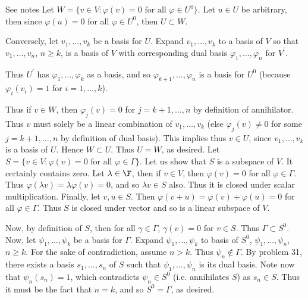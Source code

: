 \documentclass{book}
\begin{document}
\begin{enumerate}[label=\arabic*)]
\begin{enumerate}[label=\alph*)]
      \end{enumerate}
    \ii
      See notes
    \ii
      Let $W = \{v \in V: \varphi(v) = 0 \text{ for all } \varphi \in U^0\}$. Let $u \in U$ be arbitrary, then since $\varphi(u) = 0$ for all $\varphi \in U^0$, then $U \subset W$. 

      Conversely, let $v_1, \dots, v_k$ be a basis for $U$. Expand $v_1, \dots, v_k$ to a basis of $V$ so that $v_1, \dots, v_n$, $n \geq k$, is a basis of $V$ with corresponding dual basis
      $\varphi_1, \dots, \varphi_n$ for $V^{\prime}$. 

      Thus $U^{\prime}$ has $\varphi_1, \dots, \varphi_k$ as a basis, and so $\varphi_{k + 1}, \dots, \varphi_{n}$ is a basis for $U^0$ (because $\varphi_i(v_i) = 1$ for $i = 1, \dots, k$). 

      Thus if $v \in W$, then $\varphi_j(v) = 0$ for $j = k + 1, \dots, n$ by definition of annihilator. Thus $v$ must solely be a linear combination of $v_1, \dots, v_k$ (else
      $\varphi_{j}(v) \neq 0$ for some $j = k + 1, \dots, n$ by definition of dual basis). This implies thus $v \in U$, since $v_1, \dots, v_k$ is a basis of $U$. Hence $W \subset U$. Thus
      $U = W$, as desired.
    \ii
      Let $S = \{v \in V: \varphi(v) = 0 \text { for all } \varphi \in \Gamma\}$. Let us show that $S$ is a subspace of $V$. It certainly contains zero. Let $\lambda \in \F$, then if $v \in
      V$, then $\varphi(v) = 0$ for all $\varphi \in \Gamma$. Thus $\varphi(\lambda v) = \lambda\varphi(v) = 0$, and so $\lambda v \in S$ also. Thus it is closed under scalar multiplication.
      Finally, let $v, u \in S$. Then $\varphi(v + u) = \varphi(v) + \varphi(u) = 0$ for all $\varphi \in \Gamma$. Thus $S$ is closed under vector and so is a linear subspace of $V$.

      Now, by definition of $S$, then for all $\gamma \in \Gamma$, $\gamma(v) = 0$ for $v \in S$. Thus $\Gamma \subset S^0$. Now, let $\psi_1, \dots, \psi_k$ be a basis for $\Gamma$. Expand
      $\psi_1, \dots, \psi_k$ to basis of $S^0$, $\psi_1, \dots, \psi_n$, $n \geq k$. For the sake of contradiction, assume $n > k$. Thus $\psi_n \not\in \Gamma$. By problem 31, there exists
      a basis $s_1, \dots, s_n$ of $S$ such that $\psi_1, \dots, \psi_n$ is its dual basis. Note now that $\psi_n(s_n) = 1$, which contradicts $\psi_n \in S^0$ (i.e. annihilates $S$) as $s_n
      \in S$. Thus it must be the fact that $n = k$, and so $S^0 = \Gamma$, as desired.


\end{enumerate}
\end{document}
